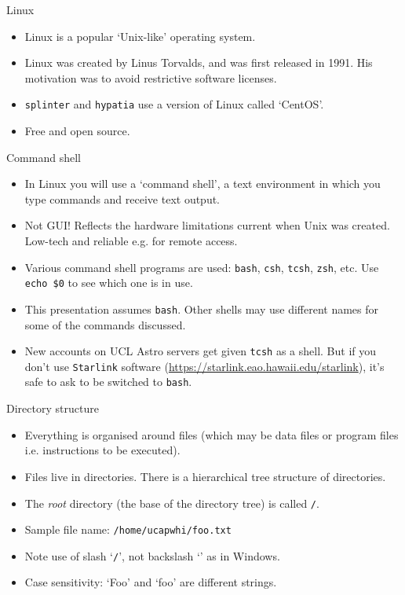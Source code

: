 \documentclass[dvipsnames]{beamer}
\newcommand{\command}[1]{\colorbox{light-gray}{\texttt{#1}}}
\newcommand{\filename}[1]{\colorbox{light-green}{\texttt{#1}}}
\newcommand{\server}[1]{\textcolor{BrickRed}{\texttt{#1}}}
\begin{document}
\begin{frame}{Linux}
  \begin{itemize}
    \item Linux is a popular `Unix-like' operating system.
    \item Linux was created by  Linus Torvalds, and was first released in 1991. His motivation was to avoid restrictive software licenses.
    \item \server{splinter} and \server{hypatia} use a version of Linux called `CentOS'.
    \item Free and open source.
   \end{itemize}
\end{frame}


\begin{frame}{Command shell}
  \begin{itemize}
    \item In Linux you will use a `command shell', a text environment in which you type commands and receive text output.
    \item Not GUI! Reflects the hardware limitations current when Unix was created. Low-tech and reliable e.g. for remote access.
    \item Various command shell programs are used: \command{bash}, \command{csh}, \command{tcsh}, \command{zsh}, etc. Use \command{echo \$0} to see which one is in use.
    \item This presentation assumes \command{bash}. Other shells may use different names for some of the commands discussed.
    \item New accounts on UCL Astro servers get given \command{tcsh} as a shell. But if you don't use \texttt{Starlink} software (\url{https://starlink.eao.hawaii.edu/starlink}), it's safe to ask to be switched to \command{bash}.
   \end{itemize}
\end{frame}


\begin{frame}{Directory structure}
  \begin{itemize}
    \item Everything is organised around files (which may be data files or program files i.e. instructions to be executed).
    \item Files live in directories. There is a hierarchical tree structure of directories.
    \item The \textit{root} directory (the base of the directory tree) is called \filename{/}.
    \item Sample file name: \filename{/home/ucapwhi/foo.txt}
    \item Note use of slash `\texttt{/}', not backslash `\texttt{}' as in Windows.
    \item Case sensitivity: `Foo' and `foo' are different strings.
  \end{itemize}
\end{frame}
\end{document}
